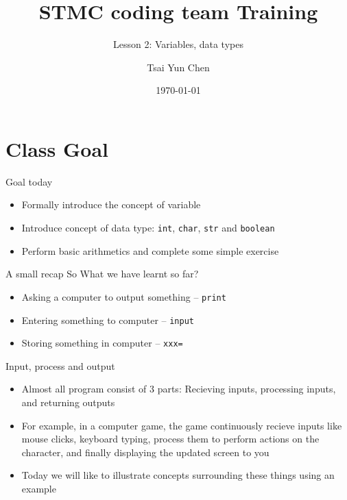 \documentclass[10pt,xcolor={table,dvipsnames},t]{beamer}
\title[Your Short Title]{STMC coding team Training}
\subtitle{Lesson 2: Variables, data types}
\author{Tsai Yun Chen}
\date{\today}
\begin{document}
\begin{frame}
  \titlepage
\end{frame}


\section{Class Goal}

\begin{frame}{Goal today}

\begin{itemize}
  \item Formally introduce the concept of variable 
  \item Introduce concept of data type: \texttt{int}, \texttt{char}, \texttt{str} and \texttt{boolean}
  \item Perform basic arithmetics and complete some simple exercise
\end{itemize}

\end{frame}

\begin{frame}{A small recap}
  So What we have learnt so far?
  \begin{itemize}
    \item Asking a computer to output something -- \texttt{print}
    \item Entering something to computer -- \texttt{input}
    \item Storing something in computer -- \texttt{xxx=}
  \end{itemize}
\end{frame}

\begin{frame}{Input, process and output}
  \begin{itemize}
    \item Almost all program consist of 3 parts: Recieving inputs, processing inputs, and returning outputs
    \item For example, in a computer game, the game continuously recieve inputs like mouse clicks, keyboard typing, process them to perform actions on the character, and finally displaying the updated screen to you
    \item Today we will like to illustrate concepts surrounding these things using an example
  \end{itemize}
\end{frame}
\end{document}
